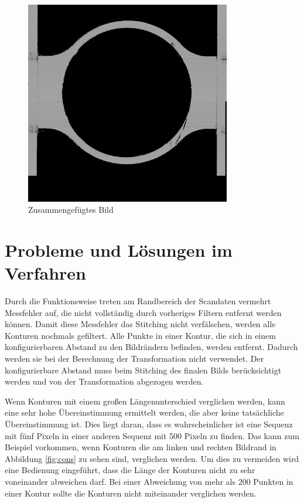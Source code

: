 \begin{figure}[h]
    \centering
    \includegraphics[width=0.8\textwidth]{images/AM_SP0_stitched_2.png} %
    \caption{Zusammengefügtes Bild}
    \label{fig:stitched_image}
\end{figure}

\section{Probleme und Lösungen im Verfahren}

Durch die Funktionsweise treten am Randbereich der Scandaten vermehrt Messfehler auf, 
die nicht vollständig durch vorheriges Filtern entfernt werden können. 
Damit diese Messfehler das Stitching nicht verfälschen, werden alle Konturen nochmals 
gefiltert. Alle Punkte in einer Kontur, die sich in einem konfigurierbaren 
Abstand zu den Bildrändern befinden, werden entfernt. Dadurch werden sie bei der 
Berechnung der Transformation nicht verwendet. 
Der konfigurierbare Abstand muss beim Stitching des finalen Bilds berücksichtigt 
werden und von der Transformation abgezogen werden.

Wenn Konturen mit einem großen Längenunterschied verglichen werden, 
kann eine sehr hohe Übereinstimmung ermittelt werden, die aber keine 
tatsächliche Übereinstimmung ist. Dies liegt daran, dass es wahrscheinlicher ist 
eine Sequenz mit fünf Pixeln in einer anderen Sequenz mit 500 Pixeln zu finden.  
Das kann zum Beispiel vorkommen, wenn Konturen 
die am linken und rechten Bildrand in Abbildung \ref{fig:cons} zu sehen sind, 
verglichen werden. Um dies zu vermeiden wird eine Bedienung eingeführt, dass die Länge
der Konturen nicht zu sehr voneinander abweichen darf. Bei einer Abweichung von mehr als
200 Punkten in einer Kontur sollte die Konturen nicht miteinander verglichen werden.

